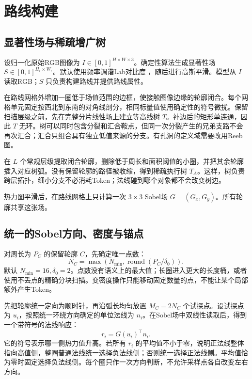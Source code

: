 \section{路线构建}
\label{sec:route}

\subsection{显著性场与稀疏增广树}

设归一化原始RGB图像为 $I\in[0,1]^{H\times W\times3}$。确定性算法生成显著性场 $S\in[0,1]^{H_r\times W_r}$。默认使用频率调谐Lab对比度 \cite{achanta2009frequency}，随后进行高斯平滑。模型从 $I$ 读取RGB；$S$ 只负责构建路线并提供路线属性。

在路线网格外增加一圈低于场值范围的边框，使接触图像边缘的轮廓闭合。每个网格单元固定按西北到东南的对角线剖分，相同标量值使用确定性的符号微扰。保留扫描层级之前，先在完整分片线性场上建立等高线树 $T$。补边后的矩形单连通，因此 $T$ 无环。树可以同时包含分裂和汇合鞍点，但同一次分裂产生的兄弟支路不会再次汇合；汇合只组合具有独立低值来源的分支。有孔洞的定义域需要改用Reeb图。

在 $L$ 个常规层级提取闭合轮廓，删除低于周长和面积阈值的小圈，并把其余轮廓插入对应树弧。没有保留轮廓的路径被收缩，得到稀疏执行树 $T_A$。这样，树负责跨层拓扑，细小分支不必消耗Token；法线碰到哪个对象都不会改变树边。

热力图平滑后，在路线网格上只计算一次 $3\times3$ Sobel场 $G=(G_x,G_y)$。所有轮廓共享这张场。

\subsection{统一的Sobel方向、密度与锚点}

对周长为 $P_C$ 的保留轮廓 $C$，先确定唯一点数：
\begin{equation}
N_C=\max\!\left(N_{\min},\operatorname{round}(P_C/\delta_0)\right).
\label{eq:budget-zh}
\end{equation}
默认 $N_{\min}=16,\delta_0=2$。点数没有语义上的最大值；长圈进入更大的长度桶，或者使用不丢点的精确分块扫描。变密度操作只能移动固定数量的点，不能让某个局部额外产生Token。

先把轮廓统一定向为顺时针，再沿弧长均匀放置 $M_C=2N_C$ 个试探点。设试探点为 $u_i$，按照统一环绕方向确定的单位法线为 $n_i$。在Sobel场中双线性读取后，得到一个带符号的法线响应：
\begin{equation}
r_i=G(u_i)^{\top}n_i.
\label{eq:sobel-response-zh}
\end{equation}
它的符号表示哪一侧热力值升高。若所有 $r_i$ 的平均值不小于零，说明正法线整体指向高值侧，整圈普通法线统一选择负法线侧；否则统一选择正法线侧。平均值恰为零时固定选择负法线侧。每个圈只作一次方向判断，不允许采样点各自改变左右方向。

